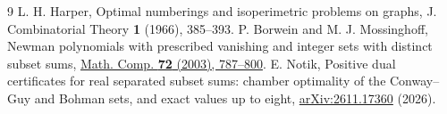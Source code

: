 \documentclass[11pt,letterpaper]{article}
\begin{document}
\begin{thebibliography}{9}
 L. H. Harper, Optimal numberings and isoperimetric
problems on graphs, J. Combinatorial Theory \textbf{1} (1966), 385--393.
 P. Borwein and M. J. Mossinghoff, Newman polynomials with
prescribed vanishing and integer sets with distinct subset sums,
\href{https://www.cecm.sfu.ca/~pborwein/PAPERS/P170.pdf}{Math. Comp.
\textbf{72} (2003), 787--800}.
 E. Notik, Positive dual certificates for real separated
subset sums: chamber optimality of the Conway--Guy and Bohman sets,
and exact values up to eight,
\href{https://arxiv.org/abs/2611.17360}{arXiv:2611.17360} (2026).
\end{thebibliography}
\end{document}
